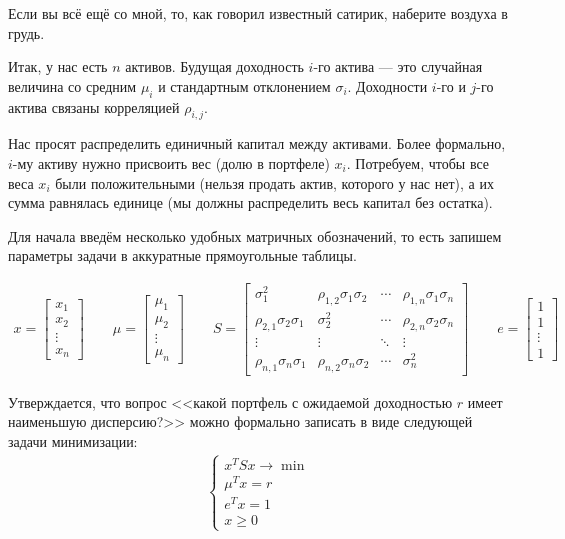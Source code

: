 Если вы всё ещё со мной, то, как говорил известный сатирик, наберите воздуха в 
грудь.

Итак, у нас есть $n$ активов. Будущая доходность $i$-го актива --- это случайная 
величина со средним $\mu_i$ и стандартным отклонением $\sigma_i$. Доходности 
$i$-го и $j$-го актива связаны корреляцией $\rho_{i,j}$.

Нас просят распределить единичный капитал между активами. Более формально,
$i$-му активу нужно присвоить вес (долю в портфеле) $x_i$. Потребуем, чтобы все 
веса $x_i$ были положительными (нельзя продать актив, которого у нас нет), а их 
сумма равнялась единице (мы должны распределить весь капитал без остатка). 

Для начала введём несколько удобных матричных обозначений, то есть запишем 
параметры задачи в аккуратные прямоугольные таблицы.

\begin{align*}
x = \begin{bmatrix}x_1 \\ x_2 \\ \vdots \\ x_n\end{bmatrix}
\qquad
\mu = \begin{bmatrix}\mu_1 \\ \mu_2 \\ \vdots \\ \mu_n\end{bmatrix}
\qquad
S = \begin{bmatrix}
\sigma_1^2 & \rho_{1,2}\sigma_1\sigma_2 & \cdots & \rho_{1,n}\sigma_1\sigma_n \\
\rho_{2,1}\sigma_2\sigma_1 & \sigma_2^2 & \cdots & \rho_{2,n}\sigma_2\sigma_n \\
\vdots & \vdots & \ddots & \vdots \\
\rho_{n,1}\sigma_n\sigma_1 & \rho_{n,2}\sigma_n\sigma_2 & \cdots & \sigma_n^2
\end{bmatrix}
\qquad
e = \begin{bmatrix}1 \\ 1 \\ \vdots \\ 1\end{bmatrix}
\end{align*}

Утверждается, что вопрос <<какой портфель с ожидаемой доходностью $r$ имеет 
наименьшую дисперсию?>> можно формально записать в виде следующей задачи 
минимизации:
\begin{align}
\begin{cases}
x^TSx \to \min \\
\mu^Tx = r \\
e^Tx = 1 \\
x \ge 0
\end{cases}
\label{portfolio_optimization_statement}
\end{align}

